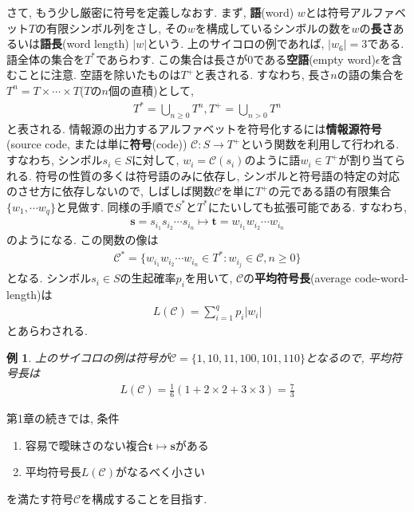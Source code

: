 \documentclass[12pt]{ltjsarticle}
\newtheorem{example}{例}
\begin{document}
さて, もう少し厳密に符号を定義しなおす.
まず, \textbf{語}(word) $w$とは符号アルファベット$T$の有限シンボル列をさし,
その$w$を構成しているシンボルの数を$w$の\textbf{長さ}あるいは\textbf{語長}(word length) $|w|$という.
上のサイコロの例であれば, $|w_6| = 3$である.
語全体の集合を$T^*$であらわす.
この集合は長さが$0$である\textbf{空語}(empty word)$\epsilon$を含むことに注意.
空語を除いたものは$T^+$と表される.
すなわち, 長さ$n$の語の集合を$T^n = T \times \cdots \times T$($T$の$n$個の直積)として,
\begin{align*}
  T^* = \bigcup_{n \geq 0} T^n, T^+ = \bigcup_{n > 0} T^n
\end{align*}
と表される.
情報源の出力するアルファベットを符号化するには\textbf{情報源符号}(source code,
または単に\textbf{符号}(code)) $\mathcal{C}: S \to T^+$という関数を利用して行われる.
すなわち, シンボル$s_i \in S$に対して, $w_i = \mathcal{C}(s_i)$のように語$w_i \in T^+$が割り当てられる.
符号の性質の多くは符号語のみに依存し, シンボルと符号語の特定の対応のさせ方に依存しないので,
しばしば関数$\mathcal{C}$を単に$T^+$の元である語の有限集合$\{w_1, \cdots w_q\}$と見做す.
同様の手順で$S^*$と$T^*$にたいしても拡張可能である.
すなわち,
\begin{align*}
  \boldsymbol{s} = s_{i_1} s_{i_2} \cdots s_{i_n} \mapsto \boldsymbol{t} = w_{i_1} w_{i_2} \cdots w_{i_n}
\end{align*}
のようになる.
この関数の像は
\begin{align*}
  \mathcal{C}^* = \{w_{i_1} w_{i_2} \cdots w_{i_n} \in T^* : w_{i_j} \in \mathcal{C}, n \geq 0\}
\end{align*}
となる.
シンボル$s_i \in S$の生起確率$p_i$を用いて, $\mathcal{C}$の\textbf{平均符号長}(average code-word-length)は
\begin{align*}
  L(\mathcal{C}) = \sum_{i = 1}^q p_i |w_i|
\end{align*}
とあらわされる.
\begin{example}
  上のサイコロの例は符号が$\mathcal{C} = \{1, 10, 11, 100, 101, 110\}$となるので, 平均符号長は
  \begin{align*}
    L(\mathcal{C}) = \frac{1}{6}(1 + 2 \times 2 + 3 \times 3) = \frac{7}{3}
  \end{align*}
\end{example}

第1章の続きでは, 条件
\begin{enumerate}
  \item 容易で曖昧さのない複合$\boldsymbol{t} \mapsto \boldsymbol{s}$がある
  \item 平均符号長$L(\mathcal{C})$がなるべく小さい
\end{enumerate}
を満たす符号$\mathcal{C}$を構成することを目指す.
\end{document}
